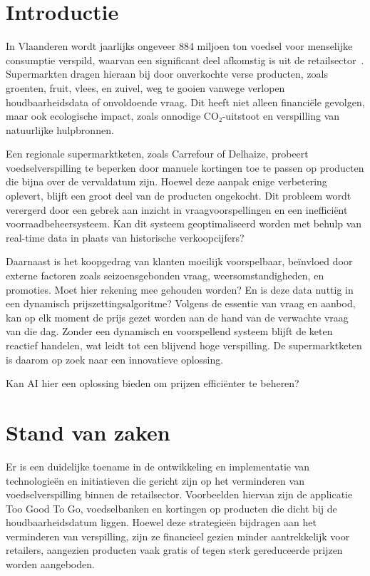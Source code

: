 
\section{Introductie}%
\label{sec:introductie}
In Vlaanderen wordt jaarlijks ongeveer 884 miljoen ton voedsel voor menselijke consumptie verspild, waarvan een significant deel afkomstig is uit de retailsector~\autocite{OVAM}.
Supermarkten dragen hieraan bij door onverkochte verse producten, zoals groenten, fruit, vlees, en zuivel,
weg te gooien vanwege verlopen houdbaarheidsdata of onvoldoende vraag. Dit heeft niet alleen financiële gevolgen,
maar ook ecologische impact, zoals onnodige CO₂-uitstoot en verspilling van natuurlijke hulpbronnen.

Een regionale supermarktketen, zoals Carrefour of Delhaize, probeert voedselverspilling te beperken door manuele kortingen toe te passen op producten die bijna over de vervaldatum zijn.
Hoewel deze aanpak enige verbetering oplevert, blijft een groot deel van de producten ongekocht.
Dit probleem wordt verergerd door een gebrek aan inzicht in vraagvoorspellingen en een inefficiënt voorraadbeheersysteem.
Kan dit systeem geoptimaliseerd worden met behulp van real-time data in plaats van historische verkoopcijfers?

Daarnaast is het koopgedrag van klanten moeilijk voorspelbaar, beïnvloed door externe factoren zoals seizoensgebonden vraag,
weersomstandigheden, en promoties.
Moet hier rekening mee gehouden worden?
En is deze data nuttig in een dynamisch prijszettingsalgoritme?
Volgens de essentie van vraag en aanbod, kan op elk moment de prijs gezet worden aan de hand van de verwachte vraag van die dag.
Zonder een dynamisch en voorspellend systeem blijft de keten reactief handelen,
wat leidt tot een blijvend hoge verspilling.
De supermarktketen is daarom op zoek naar een innovatieve oplossing.

Kan AI hier een oplossing bieden om prijzen efficiënter te beheren?

\section{Stand van zaken}%
\label{sec:state-of-the-art}
Er is een duidelijke toename in de ontwikkeling en implementatie van technologieën en initiatieven die gericht zijn op het verminderen van voedselverspilling binnen de retailsector.
Voorbeelden hiervan zijn de applicatie Too Good To Go, voedselbanken en kortingen op producten die dicht bij de houdbaarheidsdatum liggen.
Hoewel deze strategieën bijdragen aan het verminderen van verspilling, zijn ze financieel gezien minder aantrekkelijk voor retailers,
aangezien producten vaak gratis of tegen sterk gereduceerde prijzen worden aangeboden.


